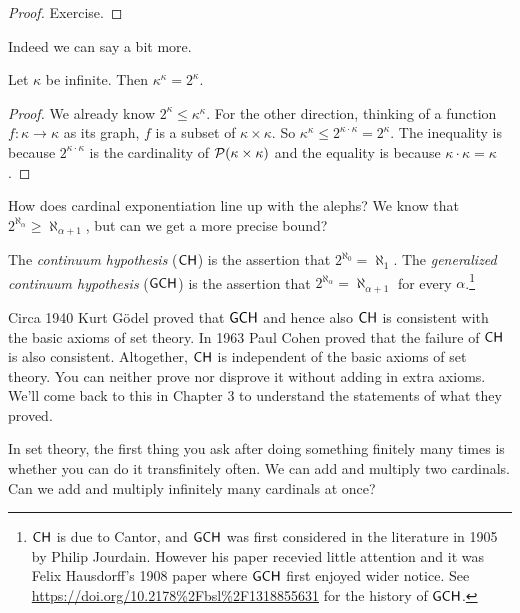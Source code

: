 \documentclass[10pt]{amsart}
\begin{document}
\begin{proof}
Exercise.
\end{proof}

Indeed we can say a bit more.

\begin{proposition}
Let $\kappa$ be infinite. Then $\kappa^\kappa = 2^\kappa$.
\end{proposition}

\begin{proof}
We already know $2^\kappa \le \kappa^\kappa$. For the other direction, thinking of a function $f: \kappa \to \kappa$ as its graph, $f$ is a subset of $\kappa \times \kappa$. So $\kappa^\kappa \le 2^{\kappa \cdot \kappa} = 2^\kappa$. The inequality is because $2^{\kappa \cdot \kappa}$ is the cardinality of $\mathcal{P}(\kappa \times \kappa)$ and the equality is because $\kappa \cdot \kappa = \kappa$.
\end{proof}

How does cardinal exponentiation line up with the alephs? We know that $2^{\aleph_\alpha} \ge \aleph_{\alpha+1}$, but can we get a more precise bound?

\begin{definition}
The \emph{continuum hypothesis} ($\mathsf{CH}$) is the assertion that $2^{\aleph_0} = \aleph_1$. The \emph{generalized continuum hypothesis} ($\mathsf{GCH}$) is the assertion that $2^{\aleph_\alpha} = \aleph_{\alpha+1}$ for every $\alpha$.\footnote{$\mathsf{CH}$ is due to Cantor, and $\mathsf{GCH}$ was first considered in the literature in 1905 by Philip Jourdain. However his paper recevied little attention and it was Felix Hausdorff's 1908 paper where $\mathsf{GCH}$ first enjoyed wider notice. See \url{https://doi.org/10.2178\%2Fbsl\%2F1318855631} for the history of $\mathsf{GCH}$.}
\end{definition}

Circa 1940 Kurt G\"odel proved that $\mathsf{GCH}$ and hence also $\mathsf{CH}$ is consistent with the basic axioms of set theory. In 1963 Paul Cohen proved that the failure of $\mathsf{CH}$ is also consistent. Altogether, $\mathsf{CH}$ is independent of the basic axioms of set theory. You can neither prove nor disprove it without adding in extra axioms. We'll come back to this in Chapter 3 to understand the statements of what they proved.
\smallskip

In set theory, the first thing you ask after doing something finitely many times is whether you can do it transfinitely often. We can add and multiply two cardinals. Can we add and multiply infinitely many cardinals at once?
\end{document}
